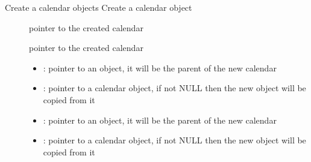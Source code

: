 \documentclass[letterpaper,10pt,english]{sphinxmanual}
\begin{document}
\begin{fulllineitems}
\label{\detokenize{object-types/calendar:_CPPv418lv_calendar_createP8lv_obj_tPK8lv_obj_t}}%
\pysigstartmultiline
{}\label{\detokenize{object-types/calendar:lv__calendar_8h_1a08e8a22a0c711a6555d4cd02fe5b684f}}%
\pysigstopmultiline
Create a calendar objects 
Create a calendar object 
\begin{description}
\item[{}] \leavevmode
pointer to the created calendar

\item[{}] \leavevmode
pointer to the created calendar 

\item[{}] \leavevmode\begin{itemize}
\item {} 
: pointer to an object, it will be the parent of the new calendar 

\item {} 
: pointer to a calendar object, if not NULL then the new object will be copied from it 

\end{itemize}

\item[{}] \leavevmode\begin{itemize}
\item {} 
: pointer to an object, it will be the parent of the new calendar 

\item {} 
: pointer to a calendar object, if not NULL then the new object will be copied from it 

\end{itemize}

\end{description}


\end{fulllineitems}

\end{document}
